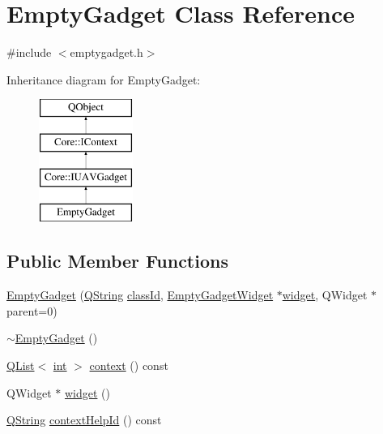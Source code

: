 \hypertarget{class_empty_gadget}{\section{Empty\-Gadget Class Reference}
\label{class_empty_gadget}
}


{\ttfamily \#include $<$emptygadget.\-h$>$}

Inheritance diagram for Empty\-Gadget\-:\begin{figure}[H]
\begin{center}
\leavevmode
\includegraphics[height=4.000000cm]{class_empty_gadget}
\end{center}
\end{figure}
\subsection*{Public Member Functions}
\begin{DoxyCompactItemize}
\item 
\hyperlink{group___empty_gadget_plugin_ga8dd994979515e846487d11c9ee923175}{Empty\-Gadget} (\hyperlink{group___u_a_v_objects_plugin_gab9d252f49c333c94a72f97ce3105a32d}{Q\-String} \hyperlink{group___core_plugin_ga3878fde66a57220608960bcc3fbeef2c}{class\-Id}, \hyperlink{class_empty_gadget_widget}{Empty\-Gadget\-Widget} $\ast$\hyperlink{group___empty_gadget_plugin_gaf90ce4fcadfb337055b06effe0fa08cb}{widget}, Q\-Widget $\ast$parent=0)
\item 
\hyperlink{group___empty_gadget_plugin_ga4c9294b56cd062b22669146def8c2cde}{$\sim$\-Empty\-Gadget} ()
\item 
\hyperlink{class_q_list}{Q\-List}$<$ \hyperlink{ioapi_8h_a787fa3cf048117ba7123753c1e74fcd6}{int} $>$ \hyperlink{group___empty_gadget_plugin_ga640557d465e9e57a080f459f9ba33c53}{context} () const 
\item 
Q\-Widget $\ast$ \hyperlink{group___empty_gadget_plugin_gaf90ce4fcadfb337055b06effe0fa08cb}{widget} ()
\item 
\hyperlink{group___u_a_v_objects_plugin_gab9d252f49c333c94a72f97ce3105a32d}{Q\-String} \hyperlink{group___empty_gadget_plugin_ga9ce48ac1c22eba730811d0885ecc9606}{context\-Help\-Id} () const 
\end{DoxyCompactItemize}
